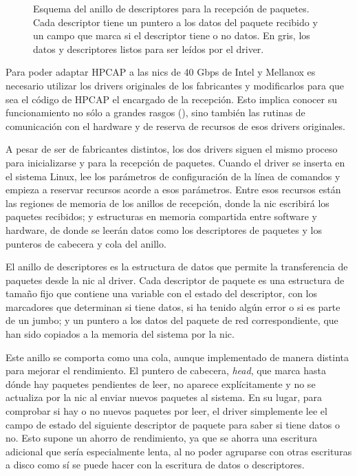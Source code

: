 \documentclass[twoside, 12pt, draft]{epstfg}
\begin{document}
\begin{figure}[btp]
\centering

\caption[Esquema del anillo de descriptores para recepción de paquetes]{Esquema del anillo de descriptores para la recepción de paquetes. Cada descriptor tiene un puntero a los datos del paquete recibido y un campo que marca si el descriptor tiene o no datos. En gris, los datos y descriptores listos para ser leídos por el \gls{driver}.}
\label{fig:DriverRings}
\end{figure}

Para poder adaptar HPCAP a las \glspl{nic} de 40 Gbps de Intel y Mellanox es necesario utilizar los \glspl{driver} originales de los fabricantes y modificarlos para que sea el código de HPCAP el encargado de la recepción. Esto implica conocer su funcionamiento no sólo a grandes rasgos (), sino también las rutinas de comunicación con el hardware y de reserva de recursos de esos \glspl{driver} originales.

A pesar de ser de fabricantes distintos, los dos \glspl{driver} siguen el mismo proceso para inicializarse y para la recepción de paquetes. Cuando el \gls{driver} se inserta en el sistema Linux, lee los parámetros de configuración de la línea de comandos y empieza a reservar recursos acorde a esos parámetros. Entre esos recursos están las regiones de memoria de los anillos de recepción, donde la \gls{nic} escribirá los paquetes recibidos; y estructuras en memoria compartida entre software y hardware, de donde se leerán datos como los descriptores de paquetes y los punteros de cabecera y cola del anillo.

El anillo de descriptores es la estructura de datos que permite la transferencia de paquetes desde la \gls{nic} al \gls{driver}. Cada descriptor de paquete es una estructura de tamaño fijo que contiene una variable con el estado del descriptor, con los marcadores que determinan si tiene datos, si ha tenido algún error o si es parte de un \gls{jumbo}; y un puntero a los datos del paquete de red correspondiente, que han sido copiados a la memoria del sistema por la \gls{nic}.

Este anillo se comporta como una cola, aunque implementado de manera distinta para mejorar el rendimiento. El puntero de cabecera, \textit{head}, que marca hasta dónde hay paquetes pendientes de leer, no aparece explícitamente y no se actualiza por la \gls{nic} al enviar nuevos paquetes al sistema. En su lugar, para comprobar si hay o no nuevos paquetes por leer, el \gls{driver} simplemente lee el campo de estado del siguiente descriptor de paquete para saber si tiene datos o no. Esto supone un ahorro de rendimiento, ya que se ahorra una escritura adicional que sería especialmente lenta, al no poder agruparse con otras escrituras a disco como sí se puede hacer con la escritura de datos o descriptores.
\end{document}
